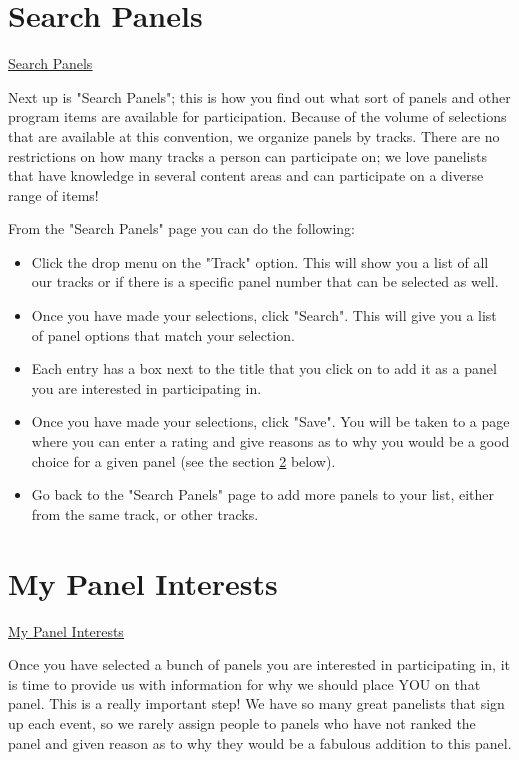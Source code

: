 \documentclass[captions=tablesignature]{scrartcl}
\begin{document}
\section{Search Panels}
\label{sec-5}
\label{my_sessions1.php}
\underline{
\href{../webpages/my_sessions1.php}{Search Panels}
}

Next up is "Search Panels"; this is how you find out what sort of
panels and other program items are available for
participation. Because of the volume of selections that are
available at this convention, we organize panels by tracks. There
are no restrictions on how many tracks a person can participate on;
we love panelists that have knowledge in several content areas and
can participate on a diverse range of items!

From the "Search Panels" page you can do the following:
\begin{itemize}
\item Click the drop menu on the "Track" option. This will show you a
list of all our tracks or if there is a specific panel number that
can be selected as well.
\item Once you have made your selections, click "Search". This will give
you a list of panel options that match your selection.
\item Each entry has a box next to the title that you click on to add it
as a panel you are interested in participating in.
\item Once you have made your selections, click "Save". You will be taken
to a page where you can enter a rating and give reasons as to why
you would be a good choice for a given panel (see the section
\ref{sec-6} below).
\item Go back to the "Search Panels" page to add more panels to your
list, either from the same track, or other tracks.
\end{itemize}

\section{My Panel Interests}
\label{sec-6}
\label{PartPanelInterests.php}
\underline{
\href{../webpages/PartPanelInterests.php}{My Panel Interests}
}

Once you have selected a bunch of panels you are interested in
participating in, it is time to provide us with information for why
we should place YOU on that panel.  This is a really important step!
We have so many great panelists that sign up each event, so we rarely
assign people to panels who have not ranked the panel and given
reason as to why they would be a fabulous addition to this panel.
\end{document}
